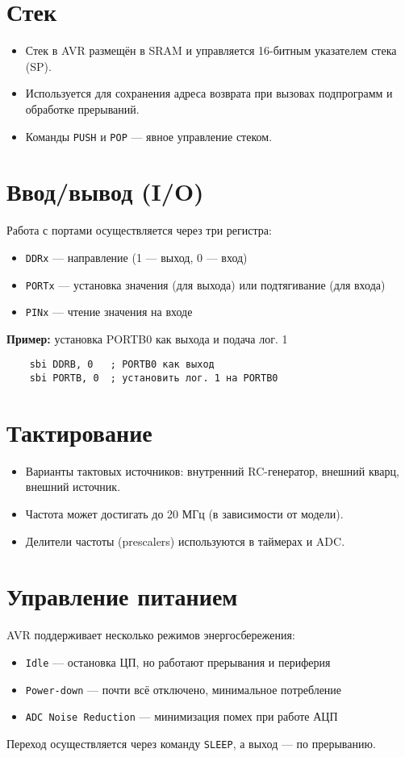 \documentclass[a4paper,12pt]{article}
\begin{document}
\section{Стек}
\begin{itemize}
    \item Стек в AVR размещён в SRAM и управляется 16-битным указателем стека (SP).
    \item Используется для сохранения адреса возврата при вызовах подпрограмм и обработке прерываний.
    \item Команды \texttt{PUSH} и \texttt{POP} — явное управление стеком.
\end{itemize}

\section{Ввод/вывод (I/O)}
Работа с портами осуществляется через три регистра:
\begin{itemize}
    \item \texttt{DDRx} — направление (1 — выход, 0 — вход)
    \item \texttt{PORTx} — установка значения (для выхода) или подтягивание (для входа)
    \item \texttt{PINx} — чтение значения на входе
\end{itemize}

\textbf{Пример:} установка PORTB0 как выхода и подача лог. 1
\begin{verbatim}
    sbi DDRB, 0   ; PORTB0 как выход
    sbi PORTB, 0  ; установить лог. 1 на PORTB0
\end{verbatim}

\section{Тактирование}
\begin{itemize}
    \item Варианты тактовых источников: внутренний RC-генератор, внешний кварц, внешний источник.
    \item Частота может достигать до 20 МГц (в зависимости от модели).
    \item Делители частоты (prescalers) используются в таймерах и ADC.
\end{itemize}

\section{Управление питанием}
AVR поддерживает несколько режимов энергосбережения:
\begin{itemize}
    \item \texttt{Idle} — остановка ЦП, но работают прерывания и периферия
    \item \texttt{Power-down} — почти всё отключено, минимальное потребление
    \item \texttt{ADC Noise Reduction} — минимизация помех при работе АЦП
\end{itemize}
Переход осуществляется через команду \texttt{SLEEP}, а выход — по прерыванию.
\end{document}
